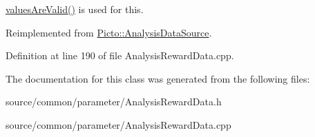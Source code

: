 \hyperlink{class_picto_1_1_parameter_a3443808da4c3edf26f2c3c3772d95b10}{values\-Are\-Valid()} is used for this. 

Reimplemented from \hyperlink{class_picto_1_1_analysis_data_source_a8d43777d1a7d1b1467c9df205d118bb3}{Picto\-::\-Analysis\-Data\-Source}.



Definition at line 190 of file Analysis\-Reward\-Data.\-cpp.



The documentation for this class was generated from the following files\-:\begin{DoxyCompactItemize}
\item 
source/common/parameter/Analysis\-Reward\-Data.\-h\item 
source/common/parameter/Analysis\-Reward\-Data.\-cpp\end{DoxyCompactItemize}
